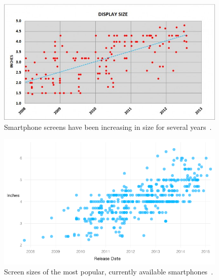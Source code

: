	\begin{figure}[ht!]
		\centering
		\includegraphics[width=110mm]{images/smartphoneSize2}
		\caption{Smartphone screens have been increasing in size for several years~\cite{smartphoneSizeChart2}.}
		\label{smartphoneSizeChart2}
	\end{figure}

\hfill

	\begin{figure}[ht!]
		\centering
		\includegraphics[width=110mm]{images/smartphoneSize}
		\caption{Screen sizes of the most popular, currently available smartphones~\cite{smartphoneSizeChart}.}
		\label{smartphoneSizeChart}
	\end{figure}






